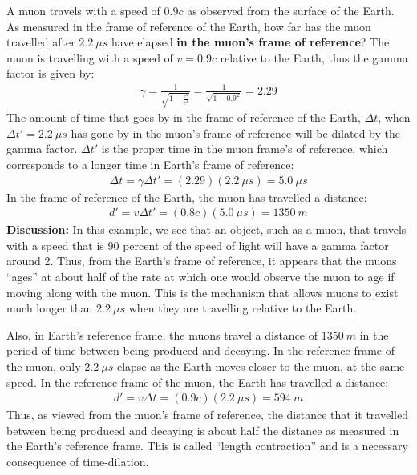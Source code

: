 \begin{example}{A muon travels with a speed of $0.9c$ as observed from the surface of the Earth. As measured in the frame of reference of the Earth, how far has the muon travelled after $\SI{2.2}{\mu s}$ have elapsed \textbf{in the muon's frame of reference}?}
The muon is travelling with a speed of $v=0.9c$ relative to the Earth, thus the gamma factor is given by:
\begin{align*}
\gamma = \frac{1}{\sqrt{1-\frac{v^2}{c^2}}} =\frac{1}{\sqrt{1-0.9^2}}=2.29
\end{align*}
The amount of time that goes by in the frame of reference of the Earth, $\Delta t$, when $\Delta t'=\SI{2.2}{\mu s}$ has gone by in the muon's frame of reference will be dilated by the gamma factor. $\Delta t'$ is the proper time in the muon frame's of reference, which corresponds to a longer time in Earth's frame of reference:
\begin{align*}
\Delta t = \gamma \Delta t' = (2.29)(\SI{2.2}{\mu s})=\SI{5.0}{\mu s}
\end{align*}
In the frame of reference of the Earth, the muon has travelled a distance:
\begin{align*}
d' = v\Delta t'=(0.8c)(\SI{5.0}{\mu s})=\SI{1350}{m}
\end{align*}
\textbf{Discussion: }In this example, we see that an object, such as a muon, that travels with a speed that is 90 percent of the speed of light will have a gamma factor around 2. Thus, from the Earth's frame of reference, it appears that the muons ``ages'' at about half of the rate at which one would observe the muon to age if moving along with the muon. This is the mechanism that allows muons to exist much longer than $\SI{2.2}{\mu s}$ when they are travelling relative to the Earth.

Also, in Earth's reference frame, the muons travel a distance of $\SI{1350}{m}$ in the period of time between being produced and decaying. In the reference frame of the muon, only $\SI{2.2}{\mu s}$ elapse as the Earth moves closer to the muon, at the same speed. In the reference frame of the muon, the Earth has travelled a distance:
\begin{align*}
d' = v\Delta t=(0.9c)(\SI{2.2}{\mu s})=\SI{594}{m}
\end{align*}
Thus, as viewed from the muon's frame of reference, the distance that it travelled between being produced and decaying is about half the distance as measured in the Earth's reference frame. This is called ``length contraction'' and is a necessary consequence of time-dilation. 
\end{example}
